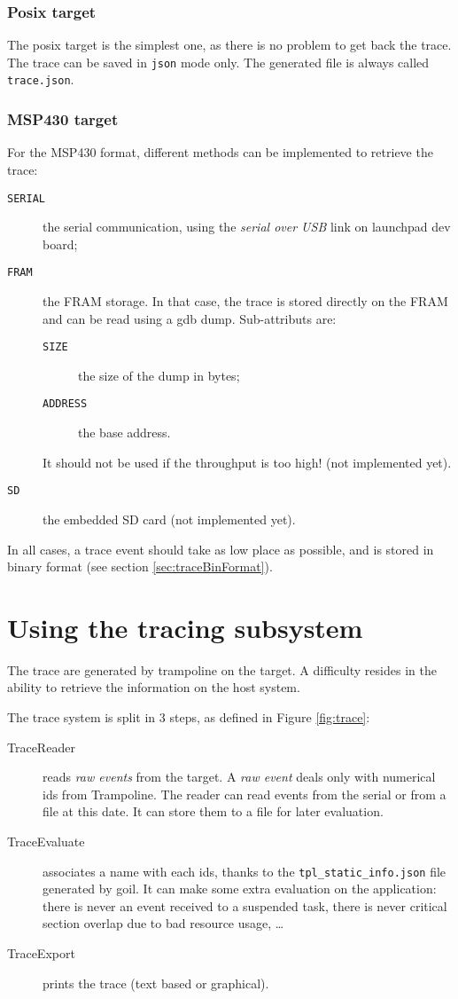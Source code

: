 \subsubsection{Posix target}
The posix target is the simplest one, as there is no problem to get back the trace. The trace can be saved in \texttt{json} mode only. The generated file is always called \texttt{trace.json}.

\subsubsection{MSP430 target}
For the MSP430 format, different methods can be implemented to retrieve the trace:
\begin{description}
	\item[\texttt{SERIAL}] the serial communication, using the \emph{serial over USB} link on launchpad dev board;
	\item[\texttt{FRAM}] the FRAM storage. In that case, the trace is stored directly on the FRAM and can be read using a gdb dump. Sub-attributs are:
\begin{description}
	\item[\texttt{SIZE}] the size of the dump in bytes;
	\item[\texttt{ADDRESS}] the base address.
\end{description} It should not be used if the throughput is too high!
(not implemented yet).

	\item[\texttt{SD}] the embedded SD card (not implemented yet).
\end{description}

In all cases, a trace event should take as low place as possible, and is stored in binary format (see section \ref{sec:traceBinFormat}).



\section{Using the tracing subsystem}

The trace are generated by trampoline on the target. A difficulty resides in the ability to retrieve the information on the host system. 

The trace system is split in 3 steps, as defined in Figure \ref{fig:trace}:
\begin{description}
	\item[TraceReader] reads \textsl{raw events} from the target. A \textsl{raw event} deals only with numerical ids from Trampoline. The reader can read events from the serial or from a file at this date. It can store them to a file for later evaluation.
	\item[TraceEvaluate] associates a name with each ids, thanks to the \lstinline{tpl_static_info.json} file generated by goil. It can make some extra evaluation on the application: there is never an event received to a suspended task, there is never critical section overlap due to bad resource usage, …
	\item[TraceExport] prints the trace (text based or graphical).
\end{description}

